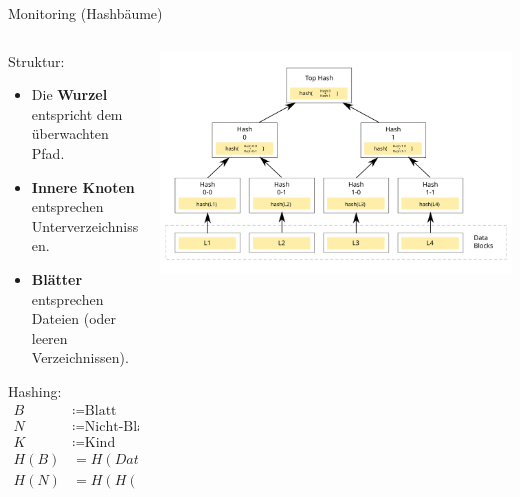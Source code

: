 \documentclass[
    ngerman,%
    authorontitle=true,
]{bfhbeamer}
\begin{document}
    \begin{frame}{Monitoring (Hashb\"aume)}
        \begin{columns}
            \begin{column}{0.5\textwidth}
                Struktur:
                \begin{itemize}
                    \item Die \textbf{Wurzel} entspricht dem überwachten Pfad.
                    \item \textbf{Innere Knoten} entsprechen Unterverzeichnissen.
                    \item \textbf{Blätter} entsprechen Dateien (oder leeren Verzeichnissen).
                \end{itemize}
                Hashing:
                \begin{align*}
                    B &\coloneqq \text{Blatt} \\
                    N &\coloneqq \text{Nicht-Blatt} \\
                    K &\coloneqq \text{Kind} \\
                    H(B) &= H(Datei)\\
                    H(N) &= H(H(K_1) \|H(K_2) \| \dots \|H(K_k))\\
                \end{align*}
            \end{column}
            \begin{column}{0.5\textwidth}
                \begin{center}
                    \includegraphics[width=1\textwidth]{assets/presentation/hashtree}
                \end{center}
            \end{column}
        \end{columns}
    \end{frame}
\end{document}
